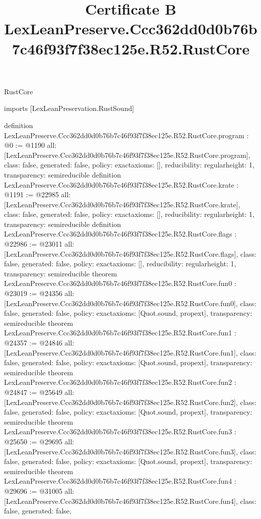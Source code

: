 \begin{lexlean}{RustCore}
\title{Certificate B LexLeanPreserve.Ccc362dd0d0b76b7c46f93f7f38ec125e.R52.RustCore}
\begin{coremodule}
imports [LexLeanPreservation.RustSound]

definition LexLeanPreserve.Ccc362dd0d0b76b7c46f93f7f38ec125e.R52.RustCore.program : @0 := @1190 {
  all: [LexLeanPreserve.Ccc362dd0d0b76b7c46f93f7f38ec125e.R52.RustCore.program],
  class: false,
  generated: false,
  policy: exact{axioms: []},
  reducibility: regular{height: 1},
  transparency: semireducible
}
definition LexLeanPreserve.Ccc362dd0d0b76b7c46f93f7f38ec125e.R52.RustCore.krate : @1191 := @22985 {
  all: [LexLeanPreserve.Ccc362dd0d0b76b7c46f93f7f38ec125e.R52.RustCore.krate],
  class: false,
  generated: false,
  policy: exact{axioms: []},
  reducibility: regular{height: 1},
  transparency: semireducible
}
definition LexLeanPreserve.Ccc362dd0d0b76b7c46f93f7f38ec125e.R52.RustCore.flags : @22986 := @23011 {
  all: [LexLeanPreserve.Ccc362dd0d0b76b7c46f93f7f38ec125e.R52.RustCore.flags],
  class: false,
  generated: false,
  policy: exact{axioms: []},
  reducibility: regular{height: 1},
  transparency: semireducible
}
theorem LexLeanPreserve.Ccc362dd0d0b76b7c46f93f7f38ec125e.R52.RustCore.fun0 : @23019 := @24356 {
  all: [LexLeanPreserve.Ccc362dd0d0b76b7c46f93f7f38ec125e.R52.RustCore.fun0],
  class: false,
  generated: false,
  policy: exact{axioms: [Quot.sound, propext]},
  transparency: semireducible
}
theorem LexLeanPreserve.Ccc362dd0d0b76b7c46f93f7f38ec125e.R52.RustCore.fun1 : @24357 := @24846 {
  all: [LexLeanPreserve.Ccc362dd0d0b76b7c46f93f7f38ec125e.R52.RustCore.fun1],
  class: false,
  generated: false,
  policy: exact{axioms: [Quot.sound, propext]},
  transparency: semireducible
}
theorem LexLeanPreserve.Ccc362dd0d0b76b7c46f93f7f38ec125e.R52.RustCore.fun2 : @24847 := @25649 {
  all: [LexLeanPreserve.Ccc362dd0d0b76b7c46f93f7f38ec125e.R52.RustCore.fun2],
  class: false,
  generated: false,
  policy: exact{axioms: [Quot.sound, propext]},
  transparency: semireducible
}
theorem LexLeanPreserve.Ccc362dd0d0b76b7c46f93f7f38ec125e.R52.RustCore.fun3 : @25650 := @29695 {
  all: [LexLeanPreserve.Ccc362dd0d0b76b7c46f93f7f38ec125e.R52.RustCore.fun3],
  class: false,
  generated: false,
  policy: exact{axioms: [Quot.sound, propext]},
  transparency: semireducible
}
theorem LexLeanPreserve.Ccc362dd0d0b76b7c46f93f7f38ec125e.R52.RustCore.fun4 : @29696 := @31005 {
  all: [LexLeanPreserve.Ccc362dd0d0b76b7c46f93f7f38ec125e.R52.RustCore.fun4],
  class: false,
  generated: false,
}
\end{coremodule}
\end{lexlean}
